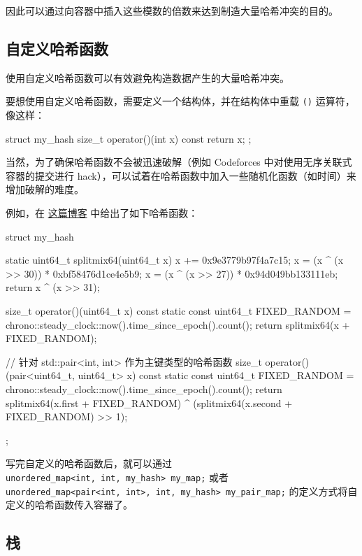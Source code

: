 因此可以通过向容器中插入这些模数的倍数来达到制造大量哈希冲突的目的。

\subsection{自定义哈希函数}\label{ux81eaux5b9aux4e49ux54c8ux5e0cux51fdux6570}

使用自定义哈希函数可以有效避免构造数据产生的大量哈希冲突。

要想使用自定义哈希函数，需要定义一个结构体，并在结构体中重载 \texttt{()} 运算符，像这样：


\begin{codeline}
struct my_hash {
  size_t operator()(int x) const { return x; }
};
\end{codeline}


当然，为了确保哈希函数不会被迅速破解（例如 Codeforces 中对使用无序关联式容器的提交进行 hack），可以试着在哈希函数中加入一些随机化函数（如时间）来增加破解的难度。

例如，在 \href{https://codeforces.com/blog/entry/62393}{这篇博客} 中给出了如下哈希函数：


\begin{codeline}
struct my_hash {
  static uint64_t splitmix64(uint64_t x) {
    x += 0x9e3779b97f4a7c15;
    x = (x ^ (x >> 30)) * 0xbf58476d1ce4e5b9;
    x = (x ^ (x >> 27)) * 0x94d049bb133111eb;
    return x ^ (x >> 31);
  }

  size_t operator()(uint64_t x) const {
    static const uint64_t FIXED_RANDOM =
        chrono::steady_clock::now().time_since_epoch().count();
    return splitmix64(x + FIXED_RANDOM);
  }

  // 针对 std::pair<int, int> 作为主键类型的哈希函数
  size_t operator()(pair<uint64_t, uint64_t> x) const {
    static const uint64_t FIXED_RANDOM =
        chrono::steady_clock::now().time_since_epoch().count();
    return splitmix64(x.first + FIXED_RANDOM) ^
           (splitmix64(x.second + FIXED_RANDOM) >> 1);
  }
};
\end{codeline}


写完自定义的哈希函数后，就可以通过 \texttt{unordered\_map\textless{}int,\ int,\ my\_hash\textgreater{}\ my\_map;} 或者 \texttt{unordered\_map\textless{}pair\textless{}int,\ int\textgreater{},\ int,\ my\_hash\textgreater{}\ my\_pair\_map;} 的定义方式将自定义的哈希函数传入容器了。

\subsection{栈}\label{ux6808}

